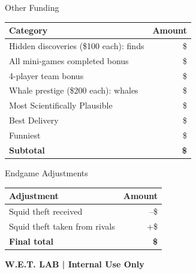 \documentclass[12pt]{extarticle}
\begin{document}
\begin{minipage}[t]{0.53\textwidth}
\vspace{0pt}
\begin{labbox}{Other Funding}
\scriptsize
\begin{tabularx}{\linewidth}{@{}Y R@{}}
\toprule
\textbf{Category} & \textbf{Amount} \\
\midrule
Hidden discoveries (\$100 each): \underline{\hspace{0.55cm}} finds & \$\underline{\hspace{1.0cm}} \\
All mini-games completed bonus & \$\underline{\hspace{1.0cm}} \\
4-player team bonus & \$\underline{\hspace{1.0cm}} \\
Whale prestige (\$200 each): \underline{\hspace{0.55cm}} whales & \$\underline{\hspace{1.0cm}} \\
Most Scientifically Plausible & \$\underline{\hspace{1.0cm}} \\
Best Delivery & \$\underline{\hspace{1.0cm}} \\
Funniest & \$\underline{\hspace{1.0cm}} \\
\midrule
\textbf{Subtotal} & \textbf{\$\underline{\hspace{1.1cm}}} \\
\bottomrule
\end{tabularx}
\end{labbox}
\end{minipage}\hfill
\begin{minipage}[t]{0.44\textwidth}
\vspace{0pt}
\begin{labbox}{Endgame Adjustments}
\scriptsize
\begin{tabularx}{\linewidth}{@{}Y R@{}}
\toprule
\textbf{Adjustment} & \textbf{Amount} \\
\midrule
Squid theft received & --\$ \underline{\hspace{0.8cm}} \\
Squid theft taken from rivals & +\$ \underline{\hspace{0.8cm}} \\
\midrule
\textbf{Final total} & \textbf{\$\underline{\hspace{0.8cm}}} \\
\bottomrule
\end{tabularx}
\end{labbox}
\end{minipage}

\vfill
\begin{center}
\footnotesize\color{agencyblue}\textbf{W.E.T. LAB | Internal Use Only}
\end{center}
\end{document}
